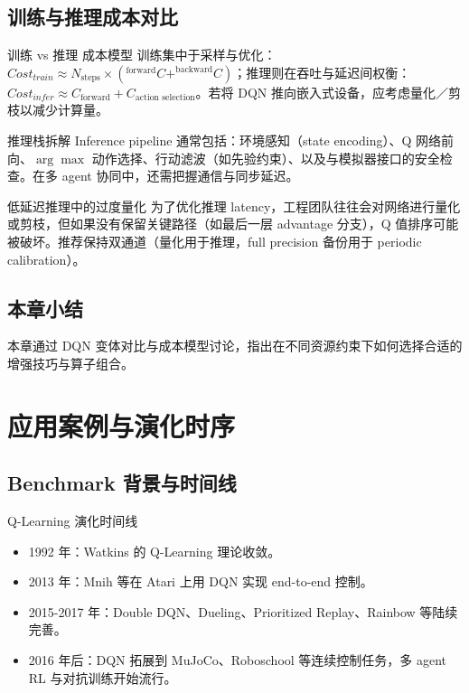 \documentclass[a4paper]{article}
\begin{document}
\subsection{训练与推理成本对比}

\begin{importantbox}{训练 vs 推理 成本模型}
训练集中于采样与优化：$Cost_{train} \approx N_{\text{steps}} \times (^{\text{forward}}C + ^{\text{backward}}C)$；推理则在吞吐与延迟间权衡：$Cost_{infer} \approx C_{\text{forward}} + C_{\text{action selection}}$。若将 DQN 推向嵌入式设备，应考虑量化／剪枝以减少计算量。
\end{importantbox}

\begin{knowledgebox}{推理栈拆解}
Inference pipeline 通常包括：环境感知（state encoding）、Q 网络前向、$\arg\max$ 动作选择、行动滤波（如先验约束）、以及与模拟器接口的安全检查。在多 agent 协同中，还需把握通信与同步延迟。
\end{knowledgebox}

\begin{warningbox}{低延迟推理中的过度量化}
为了优化推理 latency，工程团队往往会对网络进行量化或剪枝，但如果没有保留关键路径（如最后一层 advantage 分支），Q 值排序可能被破坏。推荐保持双通道（量化用于推理，full precision 备份用于 periodic calibration）。
\end{warningbox}

\subsection{本章小结}

本章通过 DQN 变体对比与成本模型讨论，指出在不同资源约束下如何选择合适的增强技巧与算子组合。

\section{应用案例与演化时序}

\subsection{Benchmark 背景与时间线}

\begin{knowledgebox}{Q-Learning 演化时间线}
\begin{itemize}
    \item 1992 年：Watkins 的 Q-Learning 理论收敛。
    \item 2013 年：Mnih 等在 Atari 上用 DQN 实现 end-to-end 控制。
    \item 2015-2017 年：Double DQN、Dueling、Prioritized Replay、Rainbow 等陆续完善。
    \item 2016 年后：DQN 拓展到 MuJoCo、Roboschool 等连续控制任务，多 agent RL 与对抗训练开始流行。
\end{itemize}
\end{knowledgebox}
\end{document}
